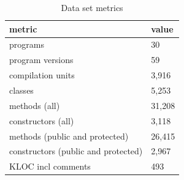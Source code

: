 \begin{table}[]
\centering
\caption{Data set metrics }
\label{tab:data-metrics}
\begin{tabular}{|l|l|} \hline
   metric & value  \\ \hline
   programs & 30  \\
   program versions & 59  \\
   compilation units & 3,916  \\
   \hline
   classes & 5,253  \\
   methods (all)& 31,208  \\
   constructors (all)& 3,118  \\
   methods (public and protected) & 26,415  \\
   constructors (public and protected) & 2,967  \\
   KLOC incl comments& 493  \\ \hline
\end{tabular}
\end{table}
